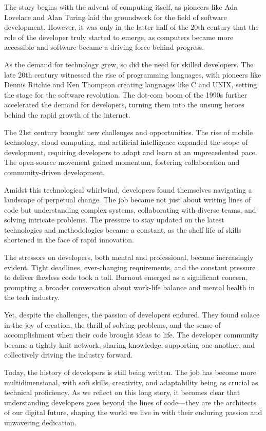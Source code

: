 \documentclass[
    a4paper, %
    10pt, %
    unnumberedsections, %
    twoside, %
]{LTJournalArticle}
\begin{document}
The story begins with the advent of computing itself, as pioneers like Ada Lovelace and Alan Turing laid the groundwork for the field of software development. However, it was only in the latter half of the 20th century that the role of the developer truly started to emerge, as computers became more accessible and software became a driving force behind progress.

As the demand for technology grew, so did the need for skilled developers. The late 20th century witnessed the rise of programming languages, with pioneers like Dennis Ritchie and Ken Thompson creating languages like C and UNIX, setting the stage for the software revolution. The dot-com boom of the 1990s further accelerated the demand for developers, turning them into the unsung heroes behind the rapid growth of the internet.

The 21st century brought new challenges and opportunities. The rise of mobile technology, cloud computing, and artificial intelligence expanded the scope of development, requiring developers to adapt and learn at an unprecedented pace. The open-source movement gained momentum, fostering collaboration and community-driven development.

Amidst this technological whirlwind, developers found themselves navigating a landscape of perpetual change. The job became not just about writing lines of code but understanding complex systems, collaborating with diverse teams, and solving intricate problems. The pressure to stay updated on the latest technologies and methodologies became a constant, as the shelf life of skills shortened in the face of rapid innovation.

The stressors on developers, both mental and professional, became increasingly evident. Tight deadlines, ever-changing requirements, and the constant pressure to deliver flawless code took a toll. Burnout emerged as a significant concern, prompting a broader conversation about work-life balance and mental health in the tech industry.

Yet, despite the challenges, the passion of developers endured. They found solace in the joy of creation, the thrill of solving problems, and the sense of accomplishment when their code brought ideas to life. The developer community became a tightly-knit network, sharing knowledge, supporting one another, and collectively driving the industry forward.

Today, the history of developers is still being written. The job has become more multidimensional, with soft skills, creativity, and adaptability being as crucial as technical proficiency. As we reflect on this long story, it becomes clear that understanding developers goes beyond the lines of code—they are the architects of our digital future, shaping the world we live in with their enduring passion and unwavering dedication.
\end{document}
